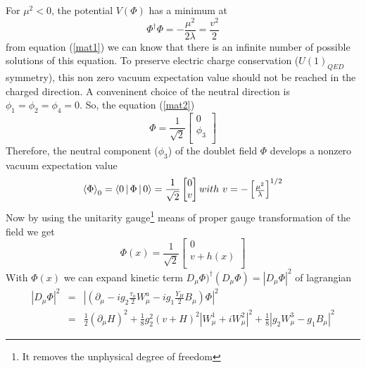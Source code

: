 For $\mu^2<0$, the potential $V(\Phi)$ has a minimum at
	\begin{equation}
	\Phi^{\dagger}\Phi = -\frac{\mu^2}{2\lambda}=\frac{v^2}{2}
	\end{equation}
from equation (\ref{mat1}) we can know that there is an infinite number of possible solutions of this equation. To preserve electric charge conservation ($U(1)_{QED}$ symmetry), this non zero vacuum expectation value should not be reached in the charged direction. A conveninent choice of the neutral direction is $\phi_1 = \phi_2 = \phi_4 = 0$. So, the equation (\ref{mat2})
	\begin{equation}
	\Phi=\frac{1}{\sqrt{2}}
		\begin{bmatrix}
		0	\\
		\phi_3	\\
		\end{bmatrix}
	\end{equation}
Therefore, the neutral component ($\phi_3$) of the doublet field $\Phi$ develops a nonzero vacuum expectation value
\begin{equation}
\Braket{\Phi}_0 = \Braket{0|\Phi|0}=\frac{1}{\sqrt{2}}
		\begin{bmatrix}
		0	\\
		v	\\
		\end{bmatrix}
		with~
		v=-
		\begin{bmatrix}
		\frac{\mu^2}{\lambda}
		\end{bmatrix}
		^{1/2}
\end{equation}
Now by using the unitarity gauge\footnote{It removes the unphysical degree of freedom} means of proper gauge transformation of the field we get
	\begin{equation}
	\Phi (x)=\frac{1}{\sqrt{2}}
		\begin{bmatrix}
		0	\\
		v+h(x)	\\
		\end{bmatrix}
	\end{equation}
With $\Phi(x)$ we can expand kinetic term $D_\mu \Phi)^{\dagger} (D_\mu \Phi)=|D_\mu \Phi|^2$ of lagrangian
	\begin{eqnarray}\label{mat3}
	|D_{\mu} \Phi|^2 & = & |(\partial_{\mu}-ig_2\frac{\tau_a}{2}W^a_{\mu}-ig_1 \frac{Y_H}{2}B_{\mu})\Phi|^2	\nonumber \\
			& = & \frac{1}{2}(\partial_\mu H)^2+\frac{1}{8}g^2_2(v+H)^2|W^1_{\mu}+iW^2_\mu|^2+\frac{1}{8}|g_2W^3_\mu-g_1B_\mu|^2
	\end{eqnarray}
